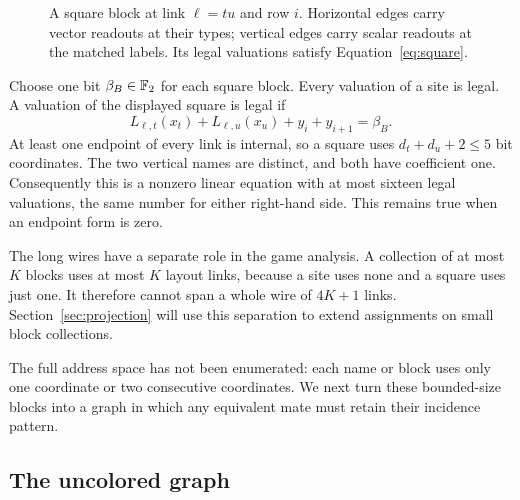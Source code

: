 \begin{figure}[htbp]
\centering
{}
\caption{A square block at link $\ell=tu$ and row $i$.
Horizontal edges carry vector readouts at their types; vertical
edges carry scalar readouts at the matched labels. Its legal
valuations satisfy Equation~\eqref{eq:square}.}
\label{fig:square}
\end{figure}

Choose one bit $\beta_B\in\mathbb F_2$ for each square block. Every
valuation of a site is legal. A valuation of the displayed square
is legal if
\begin{equation}
\label{eq:square}
L_{\ell,t}(x_t)+L_{\ell,u}(x_u)+y_i+y_{i+1}=\beta_B.
\end{equation}
At least one endpoint of every link is internal, so a square uses
$d_t+d_u+2\le 5$ bit coordinates. The two vertical names are
distinct, and both have coefficient one. Consequently this is a
nonzero linear equation with at most sixteen legal valuations,
the same number for either right-hand side. This remains true when
an endpoint form is zero.

The long wires have a separate role in the game analysis. A collection
of at most $K$ blocks uses at most $K$ layout links, because a site uses
none and a square uses just one. It therefore cannot span a whole wire
of $4K+1$ links. Section~\ref{sec:projection} will use this separation
to extend assignments on small block collections.

The full address space has not been enumerated: each name or block uses
only one coordinate or two consecutive coordinates. We next turn these
bounded-size blocks into a graph in which any equivalent mate must retain
their incidence pattern.

\subsection{The uncolored graph}

